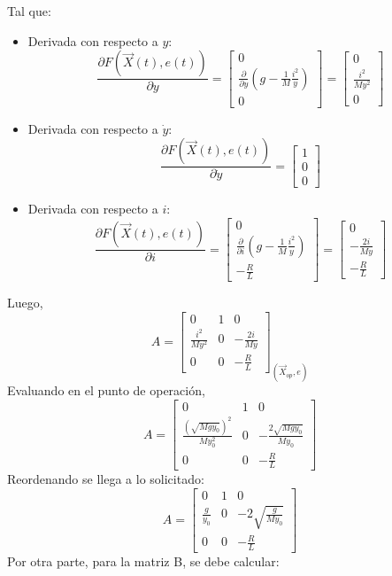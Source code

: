 \begin{enumerate}
Tal que:
\begin{itemize}
    \item Derivada con respecto a \(y\):\\
    \[
\frac{\partial F(\Vec{X}(t), e(t))}{\partial y} = 
\begin{bmatrix}
0 \\
\frac{\partial}{\partial y} \left( g - \frac{1}{M} \frac{i^2}{y} \right) \\
0
\end{bmatrix}
=
\begin{bmatrix}
0 \\
\frac{i^2}{M y^2} \\
0
\end{bmatrix}
\]
\item Derivada con respecto a \(\dot{y}\):\\
\[
\frac{\partial F(\Vec{X}(t), e(t))}{\partial \dot{y}} = 
\begin{bmatrix}
1 \\
0 \\
0
\end{bmatrix}
\]
\item Derivada con respecto a \(i\):\\
\[
\frac{\partial F(\Vec{X}(t), e(t))}{\partial i} = 
\begin{bmatrix}
0 \\
\frac{\partial}{\partial i} \left( g - \frac{1}{M} \frac{i^2}{y} \right) \\
-\frac{R}{L}
\end{bmatrix}
=
\begin{bmatrix}
0 \\
-\frac{2i}{M y} \\
-\frac{R}{L}
\end{bmatrix}
\]
\end{itemize}
Luego,
\[
A=
\begin{bmatrix}
0 & 1 & 0 \\
\frac{i^2}{M y^2} & 0 & -\frac{2i}{M y} \\
0 & 0 & -\frac{R}{L}
\end{bmatrix}_{(\Vec{X}_{op}, e)}
\]
Evaluando en el punto de operación,
\[
A=
\begin{bmatrix}
0 & 1 & 0 \\
\frac{(\sqrt{Mgy_0})^2}{M y_0^2} & 0 & -\frac{2\sqrt{Mgy_0}}{M y_0} \\
0 & 0 & -\frac{R}{L}
\end{bmatrix}
\]
Reordenando se llega a lo solicitado:
\[
A=
\begin{bmatrix}
0 & 1 & 0 \\
\frac{g}{y_0} & 0 & -2\sqrt{\frac{g}{My_0}} \\
0 & 0 & -\frac{R}{L}
\end{bmatrix}
\]
Por otra parte, para la matriz B, se debe calcular:


\end{enumerate}
